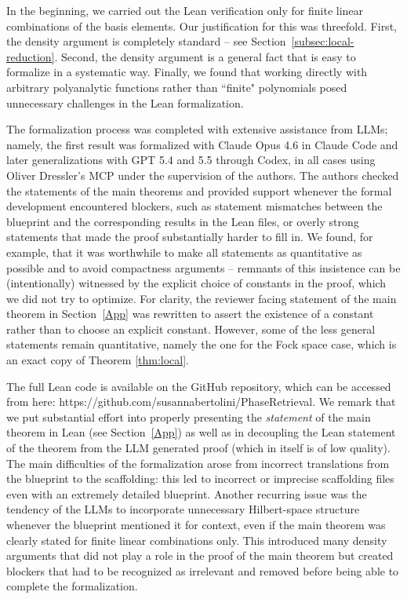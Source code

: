 \documentclass[11pt]{amsart}
\theoremstyle{remark}
\begin{document}
In the beginning, we carried out the Lean verification only for finite linear combinations of the basis elements. Our justification for this was threefold. First, the density argument is completely standard -- see Section~\ref{subsec:local-reduction}. Second, the density argument is a general fact that is easy to formalize in a systematic way. Finally, we found that working directly with arbitrary polyanalytic functions rather than ``finite" polynomials posed unnecessary challenges in the Lean formalization.
 \vspace{0.5em}



The formalization process was completed with extensive assistance from LLMs; namely, the first result was formalized with Claude Opus 4.6 in Claude Code and later generalizations with GPT 5.4 and 5.5 through Codex, in all cases using Oliver Dressler's MCP \cite{DresslerMCP} under the supervision of the authors. The authors checked the statements of the main theorems and provided support whenever the formal development encountered blockers, such as statement mismatches between the blueprint and the corresponding results in the Lean files, or overly strong statements that made the proof substantially harder to fill in. We found, for example, that it was worthwhile to make all statements as quantitative as possible and to avoid  compactness arguments -- remnants of this insistence can be (intentionally) witnessed by the explicit choice of constants in the proof, which we did not try to optimize. For clarity, the reviewer facing statement of the main theorem in Section~\ref{App} was rewritten to assert the existence of a constant rather than to choose an explicit constant. However, some of the less general statements remain quantitative, namely the one for the Fock space case, which is an exact copy of Theorem \ref{thm:local}. 
 \vspace{0.5em}

The full Lean code is available on the GitHub repository, which can be accessed from here: https://github.com/susannabertolini/PhaseRetrieval. We remark that we put substantial effort into properly presenting the \emph{statement} of the main theorem in Lean (see Section~\ref{App}) as well as in decoupling the Lean statement of the theorem from the LLM generated proof (which in itself is of low quality). The main difficulties of the formalization arose from incorrect translations from the blueprint to the scaffolding: this led to incorrect or imprecise scaffolding files even with an extremely detailed blueprint. Another recurring issue was the tendency of the LLMs to incorporate unnecessary Hilbert-space structure whenever the blueprint mentioned it for context, even if the main theorem was clearly stated for finite linear combinations only. This introduced many density arguments that did not play a role in the proof of the main theorem but created blockers that had to be recognized as irrelevant and removed before being able to complete the formalization. 
\end{document}
